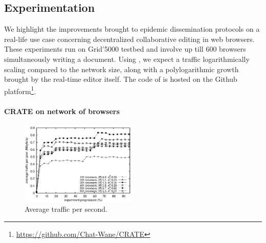 
\subsection{Experimentation}
\label{subsec:experiments2}

We highlight the improvements brought to epidemic dissemination protocols on a
real-life use case concerning decentralized collaborative editing in web
browsers.  These experiments run on Grid'5000 testbed and involve up till 600
browsers simultaneously writing a document. Using \SPRAY, we expect a traffic
logarithmically scaling compared to the network size, along with a
polylogarithmic growth brought by the real-time editor itself. The code of
\CRATE is hosted on the Github
platform\footnote{\url{https://github.com/Chat-Wane/CRATE}}.

\vspace{-7pt}
\paragraph{CRATE on network of browsers}

\begin{figure}
  \centering
  \includegraphics[width=0.49\textwidth]{img/traffic.eps}
  \caption{\label{fig:traffic}Average traffic per second.}
\end{figure}

